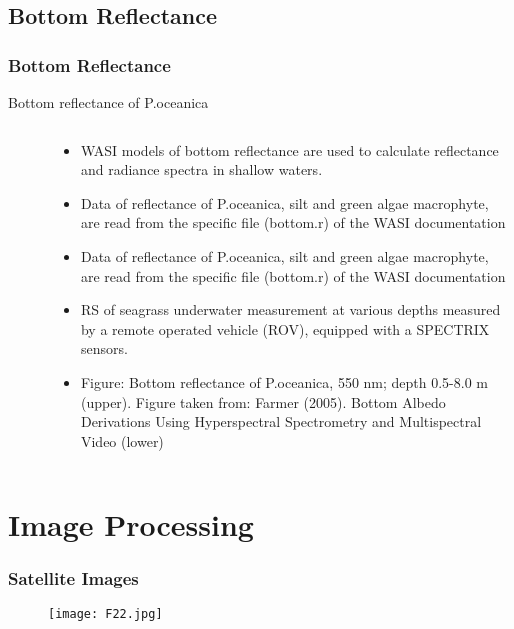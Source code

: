 \documentclass[pdflatex,compress]{beamer}
\begin{document}
\subsection{Bottom Reflectance}
\begin{frame}\frametitle{Bottom Reflectance}
Bottom reflectance of P.oceanica
\begin{minipage}[0.5\textheight]{\textwidth}
\begin{columns}[T]
\begin{column}{0.3\textwidth}
\begin{figure}[H]
	\centering
			\vspace{1mm}
\end{figure}
\end{column}
\begin{column}{0.7\textwidth}
\vspace{1em}
\scriptsize{
\begin{itemize}
	\item WASI models of bottom reflectance are used to calculate reflectance and radiance spectra in shallow waters.
	\item Data of reflectance of P.oceanica, silt and green algae macrophyte, are read from the specific file (bottom.r) of the WASI documentation
	\item Data of reflectance of P.oceanica, silt and green algae macrophyte, are read from the specific file (bottom.r) of the WASI documentation
	\item RS of seagrass underwater measurement at various depths measured by a remote operated vehicle (ROV), equipped with a SPECTRIX sensors.
	\item Figure: Bottom reflectance of P.oceanica, 550 nm; depth 0.5-8.0 m (upper). Figure taken from: Farmer (2005). Bottom Albedo Derivations Using Hyperspectral Spectrometry and Multispectral Video (lower)
\end{itemize}
}
\end{column}
\end{columns}
\end{minipage}
\end{frame}

\section{Image Processing}
\begin{frame}\frametitle{Satellite Images}
\begin{figure}[H]
	\centering
		\texttt{[image: F22.jpg]}
\end{figure}
\end{frame}
\end{document}
